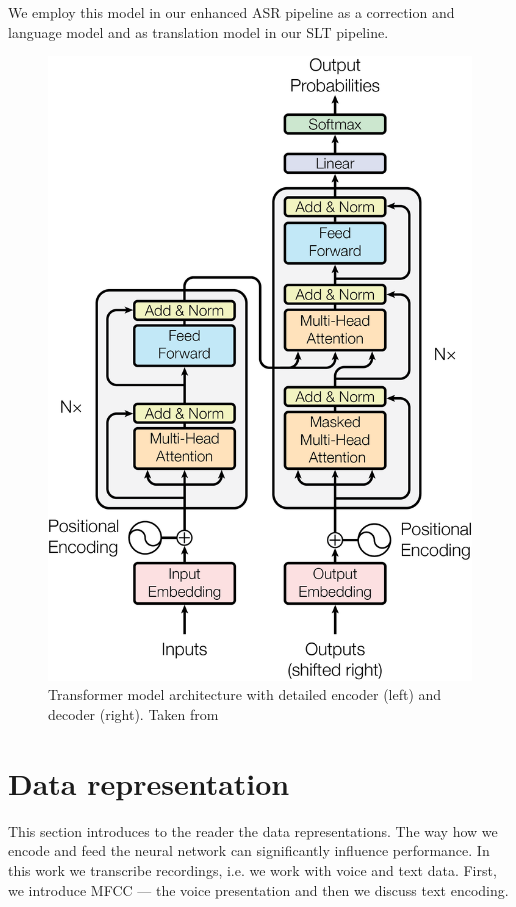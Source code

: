 We employ this model in our enhanced ASR pipeline as a correction and language model and as translation model in our SLT pipeline. 

\begin{figure}[h]
 \centering
 \includegraphics[width=\linewidth]{img/ModalNet-21.png}
 \caption{Transformer model architecture with detailed encoder (left) and decoder (right). Taken from }
 \label{fig:transformer}
\end{figure}

\section{Data representation}
This section introduces to the reader the data representations. The way how we encode and feed the neural network can significantly influence performance. In this work we transcribe recordings, i.e. we work with voice and text data. First, we introduce MFCC --- the voice presentation and then we discuss text encoding.

